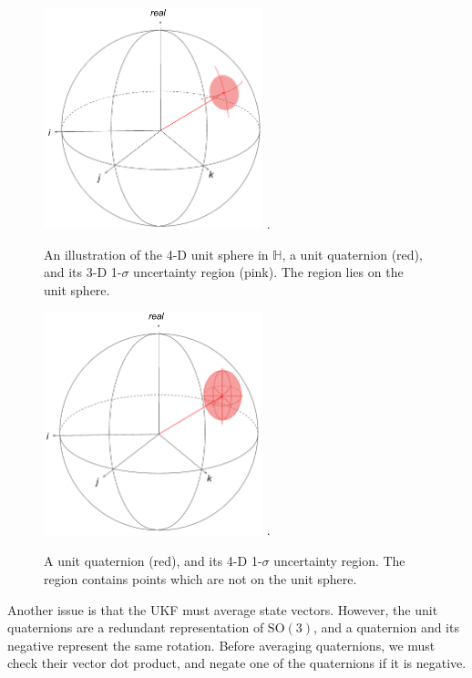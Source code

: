 \documentclass[conference]{IEEEtran}
\begin{document}
\begin{figure}[!t]
  \centering
  \includegraphics[width=2.5in]{figures/quat_uncert_3d.png}
  \DeclareGraphicsExtensions.
  \caption{An illustration of the 4-D unit sphere in $\mathbb{H}$, a unit quaternion (red), and its 3-D 1-$\sigma$ uncertainty region (pink). The region lies on the unit sphere.}
  \label{fig:quat_uncert_3d}
\end{figure}

\begin{figure}[!t]
  \centering
  \includegraphics[width=2.5in]{figures/quat_uncert_4d.png}
  \DeclareGraphicsExtensions.
  \caption{A unit quaternion (red), and its 4-D 1-$\sigma$ uncertainty region. The region contains points which are not on the unit sphere.}
  \label{fig:quat_uncert_4d}
\end{figure}

Another issue is that the UKF must average state vectors. However, the unit quaternions are a redundant representation of $\mathrm{SO(3)}$, and a quaternion and its negative represent the same rotation. Before averaging quaternions, we must check their vector dot product, and negate one of the quaternions if it is negative.\\
\end{document}
